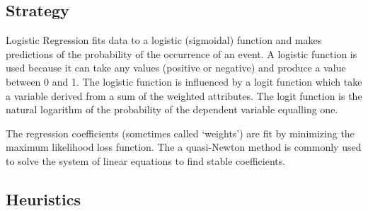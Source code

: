 \subsection{Strategy}
Logistic Regression fits data to a logistic (sigmoidal) function and makes predictions of the probability of the occurrence of an event. 
A logistic function is used because it can take any values (positive or negative) and produce a value between 0 and 1. The logistic function is influenced by a logit function which take a variable derived from a sum of the weighted attributes. The logit function is the natural logarithm of the probability of the dependent variable equalling one.

The regression coefficients (sometimes called `weights') are fit by minimizing the maximum likelihood loss function. The a quasi-Newton method is commonly used to solve the system of linear equations to find stable coefficients.

\subsection{Heuristics}

